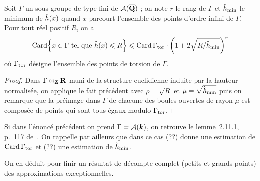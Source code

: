 \begin{coro} \label{c:small-va}
  Soit \( \Gamma \) un sous-groupe de type fini de \( \mathcal A(\overline{{\mathbf{Q}}}) \) ; on note
  \( r \) le rang de \( \Gamma \) et \( \hat h_{\mathrm{min}} \) le minimum de \(
    \hat h (x) \) quand \( x \) parcourt l'ensemble des points d'ordre infini de
  \( \Gamma \).  Pour tout réel positif \( R \), on a
  \begin{equation}
    \card \set*{
      x \in \Gamma
      \text{ tel que }
      \hautn x \le R
    }
    \le
    \card \Gamma_\torsion
    \cdot
    \left( 1 + 2\sqrt{R / \hmin} \right)^r
  \end{equation}
  où \( \Gamma_{\mathrm{tor}} \) désigne l'ensemble des points de torsion de \(
    \Gamma \).
\end{coro}

\begin{proof}
  Dans \( \Gamma \otimes_{\mathbf{Z}} {\mathbf{R}} \) muni de la structure euclidienne induite par
  la hauteur normalisée, on applique le fait précédent avec \( \rho = \sqrt R
  \) et \( \mu = \sqrt{\hat h_{\mathrm{min}}} \) puis on remarque que la préimage dans \(
    \Gamma \) de chacune des boules ouvertes de rayon \( \mu \) est composée
  de points qui sont tous égaux modulo \( \Gamma_{\mathrm{tor}} \).
\end{proof}

\begin{rem}
  Si dans l'énoncé précédent on prend \( \Gamma = \mathcal A({\boldsymbol k}) \), on retrouve le
  lemme~2.11.1, p.~117 de~\cite{farhith}. On rappelle par ailleurs que dans ce
  cas (\todo??) donne une estimation de \( \operatorname{Card} \Gamma_{\mathrm{tor}} \) et
  (\todo??) une estimation de \( \hat h_{\mathrm{min}} \).
\end{rem}

On en déduit pour finir un résultat de décompte complet (petits et grands
points) des approximations exceptionnelles.

